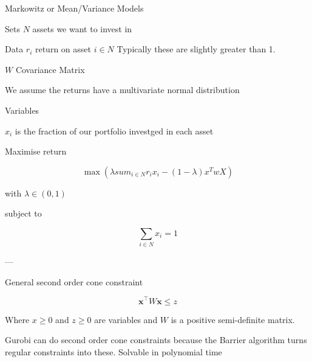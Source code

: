 Markowitz or Mean/Variance Models

Sets
$N$ assets we want to invest in

Data
$r_i$ return on asset $i \in N$
Typically these are slightly greater than 1.

$W$ Covariance Matrix

We assume the returns have a multivariate normal distribution

Variables

$x_i$ is the fraction of our portfolio investged in each asset

Maximise return

\[\max (\lambda sum_{i\in N} r_i x_i - (1-\lambda) x^T w X)\]

with
$\lambda \in (0,1)$

subject to

\[\sum_{i\in N} x_i = 1\]

---

General second order cone constraint

\[\boldsymbol{x}^\top W \boldsymbol{x} \le z\]

Where $x\ge 0$ and $z \ge 0$ are variables and $W$ is a positive semi-definite matrix.



Gurobi can do second order cone constraints because the Barrier algorithm turns regular constraints into these.
Solvable in polynomial time

